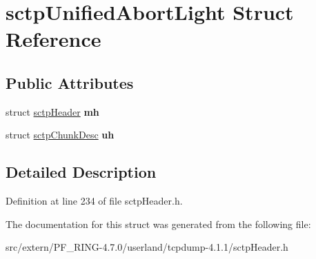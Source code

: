 \hypertarget{structsctp_unified_abort_light}{
\section{sctpUnifiedAbortLight Struct Reference}
\label{structsctp_unified_abort_light}
}
\subsection*{Public Attributes}
\begin{DoxyCompactItemize}
\item 
\hypertarget{structsctp_unified_abort_light_a9502934ac130a0938525106f7687ba90}{
struct \hyperlink{structsctp_header}{sctpHeader} {\bfseries mh}}
\label{structsctp_unified_abort_light_a9502934ac130a0938525106f7687ba90}

\item 
\hypertarget{structsctp_unified_abort_light_af1fc2f2895f42484a4033851e307ab8b}{
struct \hyperlink{structsctp_chunk_desc}{sctpChunkDesc} {\bfseries uh}}
\label{structsctp_unified_abort_light_af1fc2f2895f42484a4033851e307ab8b}

\end{DoxyCompactItemize}


\subsection{Detailed Description}


Definition at line 234 of file sctpHeader.h.



The documentation for this struct was generated from the following file:\begin{DoxyCompactItemize}
\item 
src/extern/PF\_\-RING-\/4.7.0/userland/tcpdump-\/4.1.1/sctpHeader.h\end{DoxyCompactItemize}
